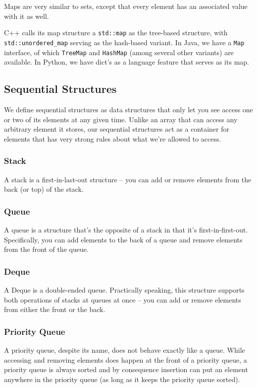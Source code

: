 Maps are very similar to sets, except that every element has an associated value with it as well.

C++ calls its map structure a \texttt{std::map} as the tree-based structure, with \texttt{std::unordered_map} serving as the hash-based variant. In Java, we have a \texttt{Map} interface, of which \texttt{TreeMap} and \texttt{HashMap} (among several other variants) are available. In Python, we have dict's as a language feature that serves as its map.

\subsection{Sequential Structures}

We define sequential structures as data structures that only let you see access one or two of its elements at any given time. Unlike an array that can access any arbitrary element it stores, our sequential structures act as a container for elements that has very strong rules about what we're allowed to access.

\subsubsection{Stack}

A stack is a first-in-last-out structure -- you can add or remove elements from the back (or top) of the stack.

\subsubsection{Queue}

A queue is a structure that's the opposite of a stack in that it's first-in-first-out. Specifically, you can add elements to the back of a queue and remove elements from the front of the queue.

\subsubsection{Deque}

A Deque is a double-ended queue. Practically speaking, this structure supports both operations of stacks at queues at once -- you can add or remove elements from either the front or the back.

\subsubsection{Priority Queue}

A priority queue, despite its name, does not behave exactly like a queue. While accessing and removing elements does happen at the front of a priority queue, a priority queue is always sorted and by consequence insertion can put an element anywhere in the priority queue (as long as it keeps the priority queue sorted).